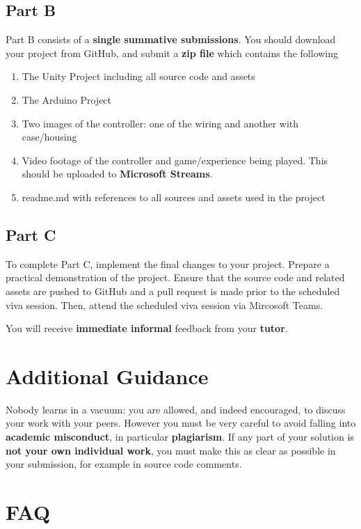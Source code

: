 \documentclass{../../fal_assignment}
\begin{document}
	\subsection*{Part B}
	
	Part B consists of a \textbf{single summative submissions}. You should download your project from GitHub, and submit a \textbf{zip file} which contains the following
	
	\begin{enumerate}
		\item The Unity Project including all source code and assets
		\item The Arduino Project
		\item Two images of the controller: one of the wiring and another with case/housing
		\item Video footage of the controller and game/experience being played. This should be uploaded to \textbf{Microsoft Streams}.
		\item readme.md with references to all sources and assets used in the project
	\end{enumerate}
	
	
	\subsection*{Part C}
	To complete Part C, implement the final changes to your project. Prepare a practical demonstration of the project. Ensure that the source code and related assets are pushed to GitHub and a pull request is made prior to the scheduled viva session. Then, attend the scheduled viva session via Mircosoft Teams. 
	
	You will receive \textbf{immediate informal} feedback from your \textbf{tutor}.
	
	\section*{Additional Guidance}

	Nobody learns in a vacuum: you are allowed, and indeed encouraged, to discuss your work with your peers. 
	However you must be very careful to avoid falling into \textbf{academic misconduct}, 
	in particular \textbf{plagiarism}. If any part of your solution is \textbf{not your own individual work}, you must make this as clear as possible in your submission, for example in source code comments.
	
	\section*{FAQ}
	
\end{document}
